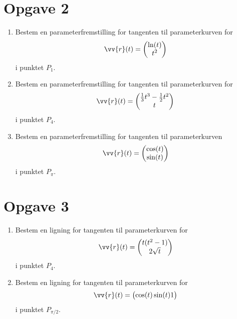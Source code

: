 \section*{Opgave 2}
\begin{enumerate}[label=\roman*)]
	\item Bestem en parameterfremstilling for tangenten til parameterkurven for
	\begin{align*}
		\vv{r}(t) = 
		\begin{pmatrix}
			\ln(t) \\
			t^2
		\end{pmatrix}
	\end{align*}
	i punktet $P_1$.
	\item Bestem en parameterfremstilling for tangenten til parameterkurven for
	\begin{align*}
		\vv{r}(t) = 
		\begin{pmatrix}
			\frac{1}{3}t^3 - \frac{1}{2}t^2 \\
			t
		\end{pmatrix}
	\end{align*}
	i punktet $P_4$.
	\item Bestem en parameterfremstilling for tangenten til parameterkurven
	\begin{align*}
		\vv{r}(t) = 
		\begin{pmatrix}
			\cos(t) \\
			\sin(t)
		\end{pmatrix}
	\end{align*}
	i punktet $P_{\pi}$.
\end{enumerate}

\section*{Opgave 3}

\begin{enumerate}[label=\roman*)]
	\item Bestem en ligning for tangenten til parameterkurven for 
	\begin{align*}
		\vv{r}(t) = 
		\begin{pmatrix}
			t(t^2-1) \\
			2\sqrt{t}
		\end{pmatrix}
	\end{align*}
	i punktet $P_4$.
	\item Bestem en ligning for tangenten til parameterkurven for 
	\begin{align*}
		\vv{r}(t) = 
		\begin{pmatrix}
			\cos(t)\sin(t)
			1
		\end{pmatrix}
	\end{align*}
	i punktet $P_{\pi/2}$.
\end{enumerate}

